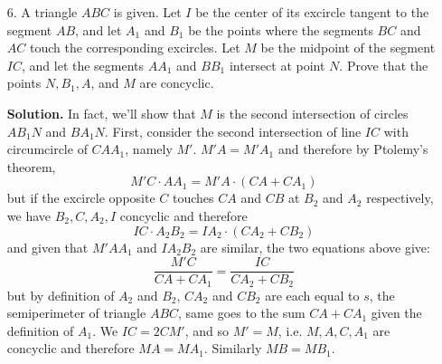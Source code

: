 \documentclass[11pt,a4paper]{article}
\begin{document}
\begin{enumerate}
	\item[6.] A triangle $ABC$ is given. Let $I$ be the center of its excircle tangent to the segment $AB$, and let $A_1$ and $B_1$ be the points where the segments $BC$ and $AC$ touch the corresponding excircles. Let $M$ be the midpoint of the segment $IC$, and let the segments $AA_1$ and $BB_1$ intersect at point $N$. Prove that the points $N, B_1, A$, and $M$ are concyclic.
	
	\textbf{Solution.} In fact, we'll show that $M$ is the second intersection of circles $AB_1N$ and $BA_1N$. First, consider the second intersection of line $IC$ with circumcircle of $CAA_1$, namely $M'$. $M'A=M'A_1$ and therefore by Ptolemy's theorem,
	\[
	M'C\cdot AA_1 = M'A \cdot (CA+CA_1) 
	\]
	but if the excircle opposite $C$ touches $CA$ and $CB$ at $B_2$ and $A_2$ respectively, we have $B_2, C, A_2, I$ concyclic and therefore 
	\[
	IC\cdot A_2B_2 = IA_2 \cdot (CA_2+CB_2) 
	\]
	and given that $M'AA_1$ and $IA_2B_2$ are similar, the two equations above give: 
	\[
	\frac{M'C}{CA+CA_1}=\frac{IC}{CA_2+CB_2}
	\]
	but by definition of $A_2$ and $B_2$, $CA_2$ and $CB_2$ are each equal to $s$, the semiperimeter of triangle $ABC$, same goes to the sum $CA+CA_1$ given the definition of $A_1$. We $IC=2CM'$, and so $M'=M$, i.e. $M, A, C, A_1$ are concyclic and therefore $MA=MA_1$. Similarly $MB=MB_1$. 
	

\end{enumerate}
\end{document}
